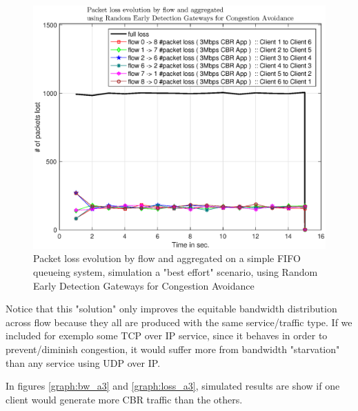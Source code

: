 \documentclass[conference,compsoc]{IEEEtran}
\begin{document}
    
    \begin{figure}[H]
    \centering
    \includegraphics[width=1\columnwidth]{EPS/A/loss_a2_red.eps}
    \caption{Packet loss evolution by flow and aggregated on a simple FIFO queueing system, simulation a "best effort" scenario, using Random Early Detection Gateways for Congestion Avoidance}\label{graph:loss_a2_red}
    \end{figure}
    
    Notice that this "solution" only improves the equitable bandwidth distribution across flow because they all are produced with the same service/traffic type. If we included for exemplo some TCP over IP service, since it behaves in order to prevent/diminish congestion, it would suffer more from  bandwidth "starvation" than any service using UDP over IP. \par
    In figures   \ref{graph:bw_a3} and \ref{graph:loss_a3}, simulated results are show if one client would generate more CBR traffic than
the others.
\end{document}
